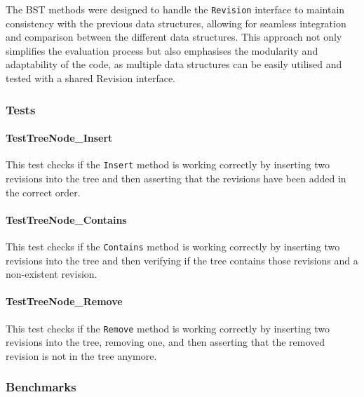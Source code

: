 The BST methods were designed to handle the \lstinline{Revision} interface to maintain consistency with the previous data structures, allowing for seamless integration and comparison between the different data structures. This approach not only simplifies the evaluation process but also emphasises the modularity and adaptability of the code, as multiple data structures can be easily utilised and tested with a shared Revision interface.

\subsubsection*{Tests}
\paragraph{TestTreeNode\_Insert}
This test checks if the \lstinline{Insert} method is working correctly by inserting two revisions into the tree and then asserting that the revisions have been added in the correct order.

\paragraph{TestTreeNode\_Contains}
This test checks if the \lstinline{Contains} method is working correctly by inserting two revisions into the tree and then verifying if the tree contains those revisions and a non-existent revision.

\paragraph{TestTreeNode\_Remove}
This test checks if the \lstinline{Remove} method is working correctly by inserting two revisions into the tree, removing one, and then asserting that the removed revision is not in the tree anymore.

\subsubsection*{Benchmarks}

